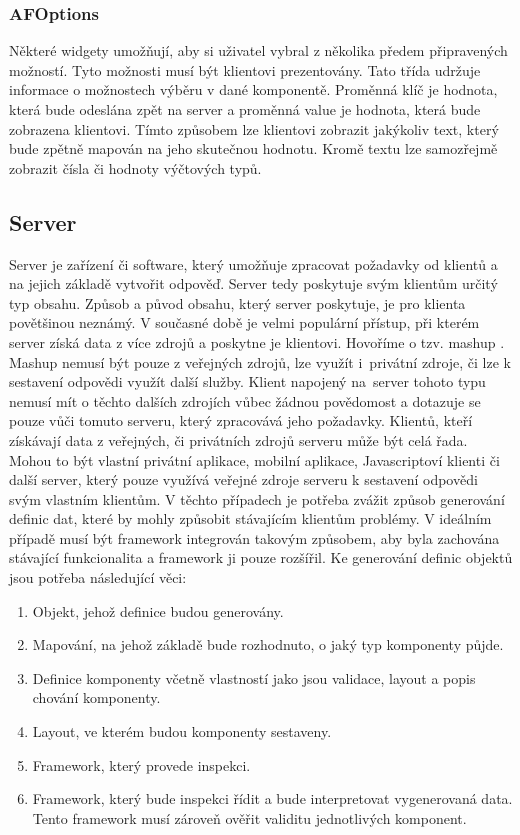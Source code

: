 \subsubsection{AFOptions}
Některé widgety umožňují, aby si uživatel vybral z několika předem připravených možností. Tyto možnosti musí být klientovi prezentovány. Tato třída udržuje informace o možnostech výběru v dané komponentě. Proměnná klíč je hodnota, která bude odeslána zpět na server a proměnná value je hodnota, která bude zobrazena klientovi. Tímto způsobem lze klientovi zobrazit jakýkoliv text, který bude zpětně mapován na jeho skutečnou hodnotu. Kromě textu lze samozřejmě zobrazit čísla či hodnoty výčtových typů.

\subsection{Server}
Server je zařízení či software, který umožňuje zpracovat požadavky od klientů a na jejich základě vytvořit odpověď. Server tedy poskytuje svým klientům určitý typ obsahu. Způsob a původ obsahu, který server poskytuje, je pro klienta povětšinou neznámý. V současné době je velmi populární přístup, při kterém server získá data z více zdrojů a poskytne je klientovi. Hovoříme o tzv. mashup \cite{Tuchinda2008}. Mashup nemusí být pouze z veřejných zdrojů, lze využít i~privátní zdroje, či lze k sestavení odpovědi využít další služby. Klient napojený na~server tohoto typu nemusí mít o těchto dalších zdrojích vůbec žádnou povědomost a dotazuje se pouze vůči tomuto serveru, který zpracovává jeho požadavky. 
Klientů, kteří získávají data z veřejných, či privátních zdrojů serveru může být celá řada. Mohou to být vlastní privátní aplikace, mobilní aplikace, Javascriptoví klienti či další server, který pouze využívá veřejné zdroje serveru k sestavení odpovědi svým vlastním klientům. V těchto případech je potřeba zvážit způsob generování definic dat, které by mohly způsobit stávajícím klientům problémy. V ideálním případě musí být framework integrován takovým způsobem, aby byla zachována stávající funkcionalita a framework ji pouze rozšířil. 
Ke generování definic objektů jsou potřeba následující věci:
\begin{enumerate}
\item Objekt, jehož definice budou generovány.
\item Mapování, na jehož základě bude rozhodnuto, o jaký typ komponenty půjde.
\item Definice komponenty včetně vlastností jako jsou validace, layout a popis chování komponenty.
\item Layout, ve kterém budou komponenty sestaveny.
\item Framework, který provede inspekci.
\item Framework, který bude inspekci řídit a bude interpretovat vygenerovaná data. Tento framework musí zároveň ověřit validitu jednotlivých komponent.
\end{enumerate}

